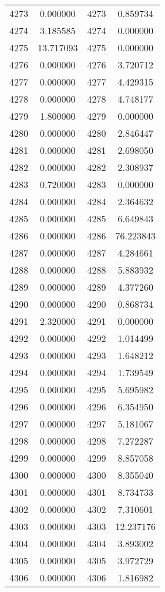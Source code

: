 \documentclass[12pt]{article}
\begin{document}
\begin{longtable}{@{}cccc@{}}
4273 & 0.000000 & 4273 & 0.859734 \\
4274 & 3.185585 & 4274 & 0.000000 \\
4275 & 13.717093 & 4275 & 0.000000 \\
4276 & 0.000000 & 4276 & 3.720712 \\
4277 & 0.000000 & 4277 & 4.429315 \\
4278 & 0.000000 & 4278 & 4.748177 \\
4279 & 1.800000 & 4279 & 0.000000 \\
4280 & 0.000000 & 4280 & 2.846447 \\
4281 & 0.000000 & 4281 & 2.698050 \\
4282 & 0.000000 & 4282 & 2.308937 \\
4283 & 0.720000 & 4283 & 0.000000 \\
4284 & 0.000000 & 4284 & 2.364632 \\
4285 & 0.000000 & 4285 & 6.649843 \\
4286 & 0.000000 & 4286 & 76.223843 \\
4287 & 0.000000 & 4287 & 4.284661 \\
4288 & 0.000000 & 4288 & 5.883932 \\
4289 & 0.000000 & 4289 & 4.377260 \\
4290 & 0.000000 & 4290 & 0.868734 \\
4291 & 2.320000 & 4291 & 0.000000 \\
4292 & 0.000000 & 4292 & 1.014499 \\
4293 & 0.000000 & 4293 & 1.648212 \\
4294 & 0.000000 & 4294 & 1.739549 \\
4295 & 0.000000 & 4295 & 5.695982 \\
4296 & 0.000000 & 4296 & 6.354950 \\
4297 & 0.000000 & 4297 & 5.181067 \\
4298 & 0.000000 & 4298 & 7.272287 \\
4299 & 0.000000 & 4299 & 8.857058 \\
4300 & 0.000000 & 4300 & 8.355040 \\
4301 & 0.000000 & 4301 & 8.734733 \\
4302 & 0.000000 & 4302 & 7.310601 \\
4303 & 0.000000 & 4303 & 12.237176 \\
4304 & 0.000000 & 4304 & 3.893002 \\
4305 & 0.000000 & 4305 & 3.972729 \\
4306 & 0.000000 & 4306 & 1.816982 \\

\end{longtable}
\end{document}
